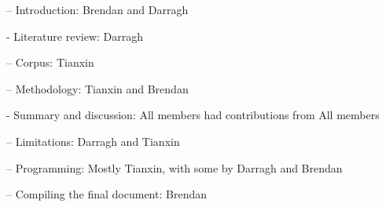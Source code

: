 \documentclass[12pt,letterpaper]{article}
\begin{document}
\begin{CJK*}{UTF8}{gbsn}
		\noindent – Introduction: Brendan and Darragh
		
		\vspace{.1cm}
		
		\noindent - Literature review: Darragh
		
		\vspace{.1cm}
		
		\noindent – Corpus: Tianxin
		
		\vspace{.1cm}
		
		\noindent – Methodology: Tianxin and Brendan
		
		\vspace{.1cm}
		
		\noindent - Summary and discussion: All members had contributions from All members
		
		\vspace{.1cm}
		
		\noindent – Limitations: Darragh and Tianxin
		
		\vspace{.1cm}
		
		\noindent – Programming: Mostly Tianxin, with some by Darragh and Brendan
		
		\vspace{.1cm}
		
		\noindent – Compiling the final document: Brendan
	\end{CJK*}
\end{document}
